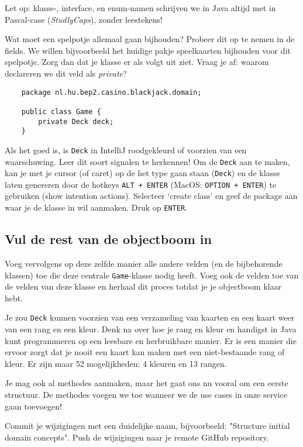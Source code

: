 Let op: klasse-, interface, en enum-namen schrijven we in Java altijd met in Pascal-case 
(\textit{StudlyCaps}), zonder leestekens!

Wat moet een spelpotje allemaal gaan bijhouden? Probeer dit op te nemen in de fields.
We willen bijvoorbeeld het huidige pakje speelkaarten bijhouden voor dit spelpotje.
Zorg dan dat je klasse er als volgt uit ziet. Vraag je af: waarom declareren we dit veld als \textit{private}?

\begin{verbatim}
    package nl.hu.bep2.casino.blackjack.domain;

    public class Game {
        private Deck deck;
    }
\end{verbatim}

Als het goed is, is \texttt{Deck} in IntelliJ roodgekleurd 
of voorzien van een waarschuwing. Leer dit soort signalen te herkennen!
Om de \texttt{Deck} aan te maken, kan je met je cursor (of caret) op de het
type gaan staan (\texttt{Deck}) en de klasse laten genereren door de hotkeys
\texttt{ALT + ENTER} (MacOS: \texttt{OPTION + ENTER}) te gebruiken 
(show intention actions). Selecteer `create class' en geef de package aan 
waar je de klasse in wil aanmaken. Druk op \texttt{ENTER}.

\subsection{Vul de rest van de objectboom in}
Voeg vervolgens op deze zelfde manier alle andere velden (en de bijbehorende klassen) toe 
die deze centrale \texttt{Game}-klasse nodig heeft.
Voeg ook de velden toe van de velden van deze klasse en herhaal dit proces totdat
je je objectboom klaar hebt.

Je zou \texttt{Deck} kunnen voorzien van een verzameling van kaarten 
en een kaart weer van een rang en een kleur. Denk na over hoe je rang en kleur en 
handigst in Java kunt programmeren op een leesbare en herbruikbare manier.
Er is een manier die ervoor zorgt dat je nooit een kaart kan maken met een niet-bestaande 
rang of kleur. Er zijn maar 52 mogelijkheden: 4 kleuren en 13 rangen.

Je mag ook al methodes aanmaken, maar het gaat ons nu vooral om een eerste structuur.
De methodes voegen we toe wanneer we de use cases in onze service gaan toevoegen!

Commit je wijzigingen met een duidelijke naam, 
bijvoorbeeld: "Structure initial domain concepts". 
Push de wijzigingen naar je remote GitHub repository.

